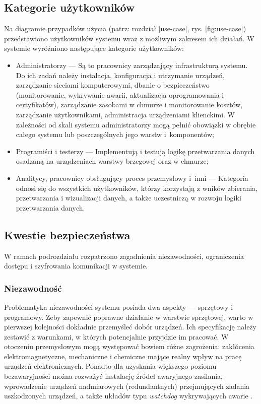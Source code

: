 \documentclass[a4paper, 12pt, twoside]{article}
\begin{document}
\subsection{Kategorie użytkowników}

Na diagramie przypadków użycia (patrz: rozdział \ref{use-case}, rys. \ref{fig:use-case})
przedstawiono użytkowników systemu wraz z możliwym zakresem ich działań.
W systemie wyróżniono następujące kategorie użytkowników:
\begin{itemize}
      \itemsep0em
      \item Administratorzy --- Są to pracownicy zarządzający infrastrukturą systemu.
            Do ich zadań należy instalacja, konfiguracja i utrzymanie urządzeń,
            zarządzanie sieciami komputerowymi, dbanie o bezpieczeństwo (monitorowanie,
            wykrywanie awarii, aktualizacja oprogramowania i certyfikatów),  zarządzanie zasobami w chmurze
            i monitorowanie kosztów, zarządzanie użytkownikami, administracja urządzeniami klienckimi.
            W zależności od skali systemu administratorzy mogą pełnić obowiązki
            w obrębie całego systemu lub poszczególnych jego warstw i~komponentów;
      \item Programiści i testerzy --- Implementują i testują logikę przetwarzania
            danych osadzaną na urządzeniach warstwy brzegowej oraz w chmurze;
      \item Analitycy, pracownicy obsługujący proces przemysłowy i~inni ---
            Kategoria odnosi się do wszystkich użytkowników, którzy korzystają z wników zbierania, przetwarzania
            i wizualizacji danych, a także uczestniczą w rozwoju logiki przetwarzania danych.
\end{itemize}

\subsection{Kwestie bezpieczeństwa}

W ramach podrozdziału rozpatrzono zagadnienia niezawodności, ograniczenia dostępu
i szyfrowania komunikacji w systemie.

\subsubsection{Niezawodność}

Problematyka niezawodności systemu posiada dwa aspekty --- sprzętowy i programowy.
Żeby zapewnić poprawne działanie w warstwie sprzętowej, warto w pierwszej
kolejności dokładnie przemyśleć dobór urządzeń. Ich specyfikację należy zestawić
z warunkami, w których potencjalnie przyjdzie im pracować. W otoczeniu przemysłowym
mogą występować bowiem różne zagrożenia: zakłócenia elektromagnetyczne,
mechaniczne i chemiczne mające realny wpływ na pracę urządzeń elektronicznych.
Ponadto dla uzyskania większego poziomu bezawaryjności można rozważyć
instalację źródeł awaryjnego zasilania, wprowadzenie urządzeń nadmiarowych (redundantnych)
przejmujących zadania uszkodzonych urządzeń, a także układów typu \emph{watchdog}
wykrywających awarie \cite{isp}.
\end{document}
